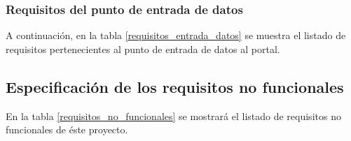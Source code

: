 \subsubsection{Requisitos del punto de entrada de datos}
A continuación, en la tabla \ref{requisitos_entrada_datos} se muestra el listado de requisitos pertenecientes al punto de entrada de datos al portal.



\subsection{Especificación de los requisitos no funcionales}
En la tabla \ref{requisitos_no_funcionales} se mostrará el listado de requisitos no funcionales de éste proyecto.
